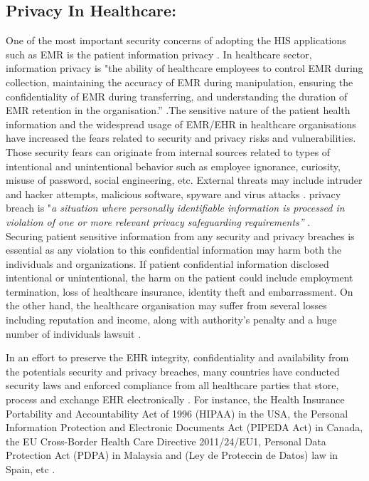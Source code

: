 \subsection{Privacy In Healthcare:}
One of the most important security concerns of adopting the HIS applications such as EMR is the patient information privacy \cite{Mahfuth2016}. In healthcare sector, information privacy is "the ability of healthcare employees to control EMR during collection, maintaining the accuracy of EMR during manipulation, ensuring the confidentiality of EMR during transferring, and understanding the duration of EMR retention in the organisation.”  \cite{Rahim2016}.The sensitive nature of the patient health information and the widespread usage of EMR/EHR in healthcare organisations have increased the fears related to security and privacy risks and vulnerabilities. Those security fears can originate from internal sources related to types of intentional and unintentional behavior such as employee ignorance, curiosity, misuse of password, social engineering, etc. External threats may include intruder and hacker attempts, malicious software, spyware and virus attacks  \cite{Samy2010b}. privacy breach is "\textit{a situation where personally identifiable information is processed in violation of one or more relevant privacy safeguarding requirements”} \cite{ISO/IEC}.\\Securing patient sensitive information from any security and privacy breaches is essential as any violation to this confidential information may harm both the individuals and organizations. If patient confidential information disclosed intentional or unintentional, the harm on the patient could include employment termination, loss of healthcare insurance, identity theft and embarrassment. On the other hand, the healthcare organisation may suffer from several losses including reputation and income, along with authority’s penalty and a huge number of individuals lawsuit \cite{Wartenberg2010,Culnan2016}. 

In an effort to preserve the EHR integrity, confidentiality and availability from the potentials security and privacy breaches, many countries have conducted security laws and enforced compliance from all healthcare parties that store, process and exchange EHR electronically \cite{Hsu,Samy2010,Rahim2016}. For instance, the Health Insurance Portability and Accountability Act of 1996
(HIPAA) in the USA, the Personal Information Protection and Electronic Documents Act (PIPEDA Act) in Canada, the EU Cross-Border Health Care Directive 2011/24/EU1, Personal Data Protection Act (PDPA) in Malaysia and (Ley de Proteccin de Datos) law in Spain, etc \cite{Bensefia2014,U.S.DepartmentofHealthandHumanServices}. 


